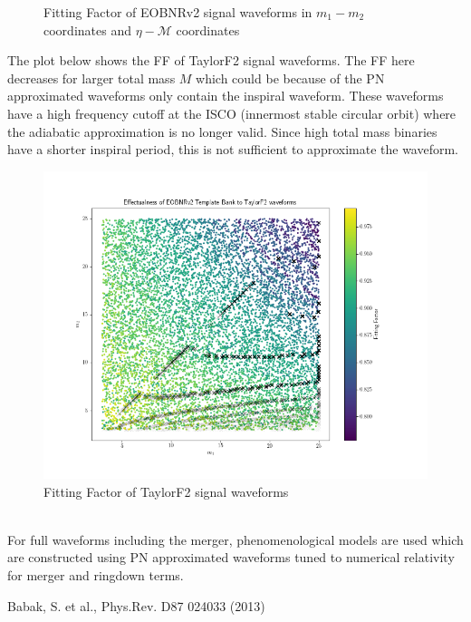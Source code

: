 \documentclass{article}
\begin{document}
\begin{figure}[h]
\begin{minipage}{0.5\textwidth}
        \label{fig:effectualnessEOBetamchirp}
    \end{minipage}
    \caption{Fitting Factor of EOBNRv2 signal waveforms in $m_1-m_2$ coordinates and $\eta-\mathcal{M}$ coordinates}
    \label{fig:effectualnessEOB}
\end{figure}
The plot below shows the FF of TaylorF2 signal waveforms. The FF here decreases for larger total mass $M$ which could be because of the PN approximated waveforms only contain the inspiral waveform. These waveforms have a high frequency cutoff at the ISCO (innermost stable circular orbit) where the adiabatic approximation is no longer valid. Since high total mass binaries have a shorter inspiral period, this is not sufficient to approximate the waveform.  
\begin{figure}[h!]
    \centering
    \includegraphics[scale=0.3]{EffectualnessTaylorF2.png}
    \caption{Fitting Factor of TaylorF2 signal waveforms}
    \label{fig:effectualnessTaylorF2}
\end{figure}
\\
For full waveforms including the merger, phenomenological models are used which are constructed using PN approximated waveforms tuned to numerical relativity for merger and ringdown terms. 


\begin{thebibliography}{1}
 Babak, S. et al., Phys.Rev. D87 024033 (2013)
\end{thebibliography}
\end{document}
